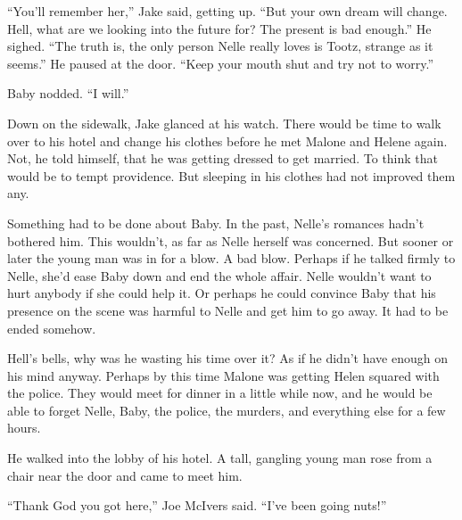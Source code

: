 \documentclass{novel}
\begin{document}
“You’ll remember her,” Jake said, getting up. “But your own dream will change. Hell, what are we looking into the future for? The present is bad enough.” He sighed. “The truth is, the only person Nelle really loves is Tootz, strange as it seems.” He paused at the door. “Keep your mouth shut and try not to worry.”

Baby nodded. “I will.”

Down on the sidewalk, Jake glanced at his watch. There would be time to walk over to his hotel and change his clothes before he met Malone and Helene again. Not, he told himself, that he was getting dressed to get married. To think that would be to tempt providence. But sleeping in his clothes had not improved them any.

Something had to be done about Baby. In the past, Nelle’s romances hadn’t bothered him. This wouldn’t, as far as Nelle herself was concerned. But sooner or later the young man was in for a blow. A bad blow. Perhaps if he talked firmly to Nelle, she’d ease Baby down and end the whole affair. Nelle wouldn’t want to hurt anybody if she could help it. Or perhaps he could convince Baby that his presence on the scene was harmful to Nelle and get him to go away. It had to be ended somehow.

Hell’s bells, why was he wasting his time over it? As if he didn’t have enough on his mind anyway. Perhaps by this time Malone was getting Helen squared with the police. They would meet for dinner in a little while now, and he would be able to forget Nelle, Baby, the police, the murders, and everything else for a few hours.

He walked into the lobby of his hotel. A tall, gangling young man rose from a chair near the door and came to meet him.

“Thank God you got here,” Joe McIvers said. “I’ve been going nuts!”

\vspace{2\nbs}
\clearpage
\thispagestyle{empty}

\begin{ChapterStart}
\vspace{3\nbs}
\end{ChapterStart}
\end{document}
